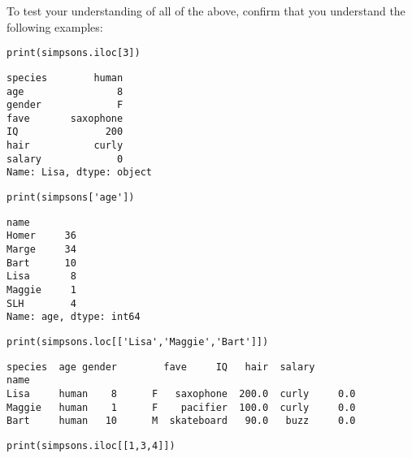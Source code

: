 To test your understanding of all of the above, confirm that you understand the
following examples:

\begin{Verbatim}[fontsize=\scriptsize,samepage=true,frame=single,framesep=3mm]
print(simpsons.iloc[3])
\end{Verbatim}
\vspace{-.2in}

\begin{Verbatim}[fontsize=\scriptsize,samepage=true,frame=leftline,framesep=5mm,framerule=1mm]
species        human
age                8
gender             F
fave       saxophone
IQ               200
hair           curly
salary             0
Name: Lisa, dtype: object
\end{Verbatim}

\medskip

\begin{Verbatim}[fontsize=\scriptsize,samepage=true,frame=single,framesep=3mm]
print(simpsons['age'])
\end{Verbatim}
\vspace{-.2in}

\begin{Verbatim}[fontsize=\scriptsize,samepage=true,frame=leftline,framesep=5mm,framerule=1mm]
name
Homer     36
Marge     34
Bart      10
Lisa       8
Maggie     1
SLH        4
Name: age, dtype: int64
\end{Verbatim}

\medskip
\begin{Verbatim}[fontsize=\scriptsize,samepage=true,frame=single,framesep=3mm]
print(simpsons.loc[['Lisa','Maggie','Bart']])
\end{Verbatim}
\vspace{-.2in}

\begin{Verbatim}[fontsize=\scriptsize,samepage=true,frame=leftline,framesep=5mm,framerule=1mm]
       species  age gender        fave     IQ   hair  salary
name                                                        
Lisa     human    8      F   saxophone  200.0  curly     0.0
Maggie   human    1      F    pacifier  100.0  curly     0.0
Bart     human   10      M  skateboard   90.0   buzz     0.0
\end{Verbatim}

\medskip
\begin{Verbatim}[fontsize=\scriptsize,samepage=true,frame=single,framesep=3mm]
print(simpsons.iloc[[1,3,4]])
\end{Verbatim}
\vspace{-.2in}

